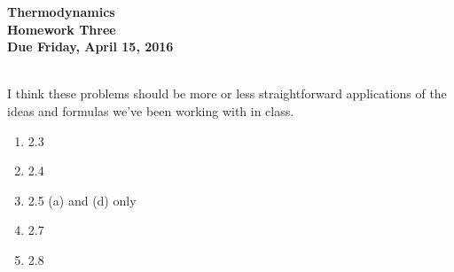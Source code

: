 \documentclass[12pt]{article}
\begin{document}
\pagestyle{empty}
 
\begin{center}
{\large {\bf Thermodynamics}}\\
\medskip
{\large {\bf Homework Three}}\\
\medskip
{ {\bf Due Friday, April 15, 2016}}\\
\end{center}

\hspace{2mm}\\
\noindent  I think these problems should be more or less
straightforward applications of the ideas and formulas we've been
working with in class.  

\begin{enumerate}
\setlength{\itemsep}{1mm}
  \item 2.3
  \item 2.4
  \item 2.5 (a) and (d) only
  \item 2.7
  \item 2.8
\end{enumerate}
\end{document}
